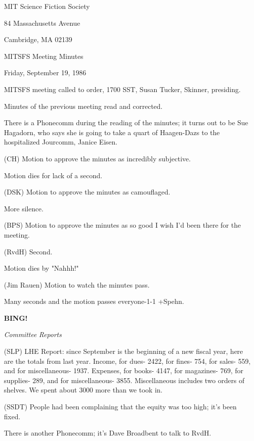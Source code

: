 \documentclass[12pt]{article}
\newcommand{\bing}{{\bf BING!} }
\newcommand{\goto}[1]{\bing \vskip 12pt \centerline{{\em{#1}}}}
\begin{document}
\begin{center}

MIT Science Fiction Society 

84 Massachusetts Avenue

Cambridge, MA 02139

\vspace{12pt}

MITSFS Meeting Minutes 

Friday, September 19, 1986

\end{center}
 
\vspace{18pt}

\setlength{\parskip}{6pt}

\noindent
MITSFS meeting called to order, 1700 SST,
Susan Tucker, Skinner, presiding.

Minutes of the previous meeting read and corrected.

There is a Phonecomm during the reading of the minutes; it turns out to be Sue Hagadorn, who says she is going to take a quart of Haagen-Dazs to the hospitalized Jourcomm, Janice Eisen.

(CH) Motion to approve the minutes as incredibly subjective.

Motion dies for lack of a second.

(DSK) Motion to approve the minutes as camouflaged.

More silence.

(BPS) Motion to approve the minutes as so good I wish I'd been there for the meeting.

(RvdH) Second.

Motion dies by "Nahhh!"

(Jim Rauen) Motion to watch the minutes pass.

Many seconds and the motion passes everyone-1-1 +Spehn.

\goto{Committee Reports}

(SLP) LHE Report: since September is the beginning of a new fiscal year, here are the totals from last year. Income, for dues- 2422, for fines- 754, for sales- 559, and for miscellaneous- 1937. Expenses, for books- 4147, for magazines- 769, for supplies- 289, and for miscellaneous- 3855. Miscellaneous includes two orders of shelves. We spent about 3000 more than we took in.

(SSDT) People had been complaining that the equity was too high; it's been fixed.

There is another Phonecomm; it's Dave Broadbent to talk to RvdH.
\end{document}
